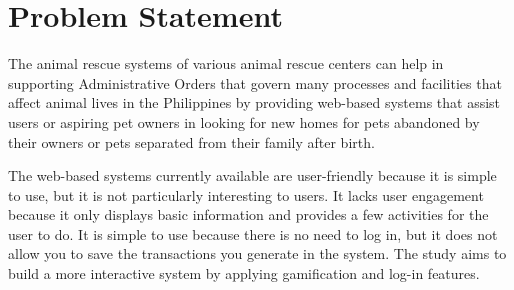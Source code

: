   





\section{Problem Statement}

The animal rescue systems of various animal rescue centers can help in supporting
Administrative Orders that govern many processes and facilities that affect
animal lives in the Philippines by providing web-based systems that assist users or
aspiring pet owners in looking for new homes for pets abandoned by their owners
or pets separated from their family after birth.

The web-based systems currently available are user-friendly because it is simple
to use, but it is not particularly interesting to users. It lacks user engagement
because it only displays basic information and provides a few activities for the
user to do. It is simple to use because there is no need to log in, but it does not
allow you to save the transactions you generate in the system. The study aims to
build a more interactive system by applying gamification and log-in features.


